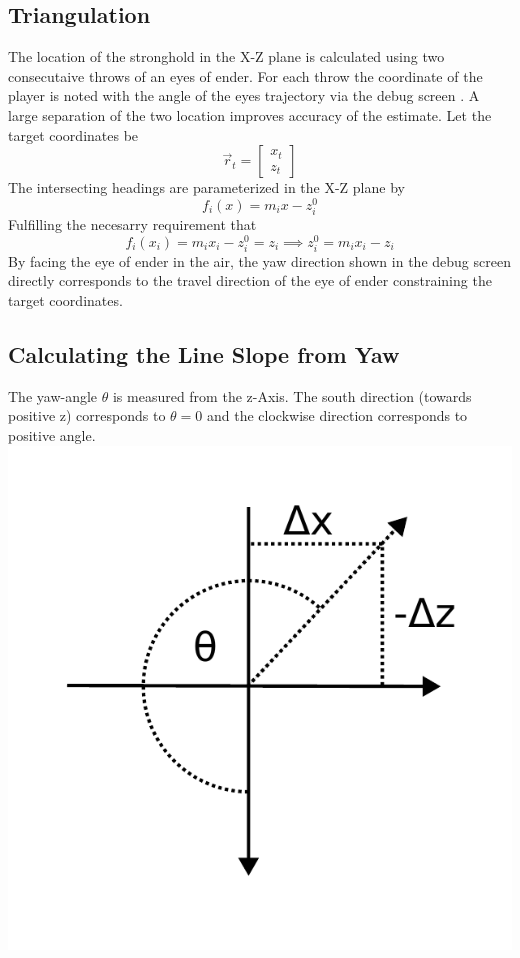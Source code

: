 \documentclass[a4paper,10pt]{article}
\begin{document}
\begin{multicols}{2}
    \section{Triangulation}
    The location of the stronghold in the X-Z plane is calculated using two consecutaive throws of an eyes of ender.
    For each throw the coordinate of the player is noted with the angle of the eyes trajectory via the debug screen \cite{wiki_debugscreen}.
    A large separation of the two location improves accuracy of the estimate.
    Let the target coordinates be
    \begin{equation}
        \vec{r}_t = \begin{bmatrix}
            x_t\\z_t
        \end{bmatrix}
    \end{equation}
    The intersecting headings are parameterized in the X-Z plane by
    \begin{equation}
        f_i(x) = m_i x - z_i^0
    \end{equation}
    Fulfilling the necesarry requirement that
    \begin{equation}
        f_i(x_i) = m_i x_i - z_i^0 = z_i \implies z_i^0 = m_i x_i - z_i
    \end{equation}
    By facing the eye of ender in the air, the yaw direction shown in the debug screen directly corresponds to the travel direction of the eye of ender constraining the target coordinates.
    
    \subsection{Calculating the Line Slope from Yaw}

    The yaw-angle $\theta$ is measured from the z-Axis.
    The south direction (towards positive z) corresponds to $\theta = 0$ and the clockwise direction corresponds to positive angle.
    \includegraphics[width = \linewidth]{img/theta.pdf}


\end{multicols}
\end{document}

